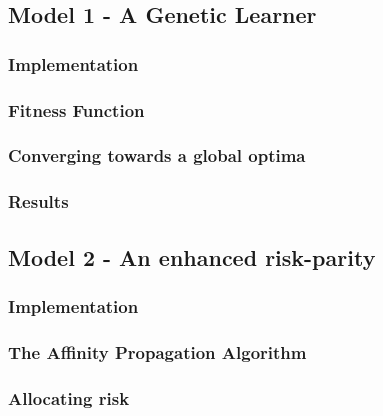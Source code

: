 \documentclass[12pt]{article} %
\numberwithin{equation}{subsection}
\begin{document}
\subsection{Model 1 - A Genetic Learner}




\subsubsection{Implementation}



\subsubsection{Fitness Function}



\subsubsection{Converging towards a global optima}



\subsubsection{Results}



\subsection{Model 2 - An enhanced risk-parity}



\subsubsection{Implementation}




\subsubsection{The Affinity Propagation Algorithm}



\subsubsection{Allocating risk}
\end{document}

